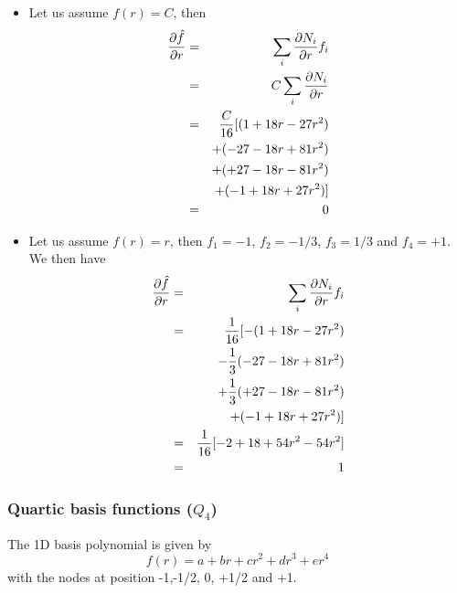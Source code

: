 \begin{itemize}
\item
Let us assume $f(r)=C$, then
\begin{eqnarray}
\frac{\partial \hat{f}}{\partial r} 
&=& \sum_i \frac{\partial N_i}{\partial r} f_i  \nonumber\\
&=&  C \sum_i \frac{\partial N_i}{\partial r}  \nonumber\\
&=& \frac{C}{16} [  (  1 +18r - 27r^2 ) \nonumber\\
&&+ (-27 -18r + 81r^2 )  \nonumber\\
&&+  (+27 -18r - 81r^2 ) \nonumber\\
&&+ ( -1 +18r + 27r^2 ) ]  \nonumber\\
&=& 0 \nonumber
\end{eqnarray}

\item
Let us assume $f(r)= r$, then $f_1=-1$, $f_2=-1/3$, $f_3=1/3$ and $f_4=+1$. We then have
\begin{eqnarray}
\frac{\partial \hat{f}}{\partial r} 
&=& \sum_i \frac{\partial N_i}{\partial r} f_i  \nonumber\\
&=& \frac{1}{16} [  -(  1 +18r - 27r^2 ) \nonumber\\ 
&& -\frac{1}{3} (-27 -18r + 81r^2 )  \nonumber\\
&& +\frac{1}{3}  (+27 -18r - 81r^2 ) \nonumber\\
&& + ( -1 +18r + 27r^2 ) ]  \nonumber\\
&=& \frac{1}{16} [-2 + 18 + 54r^2 - 54r^2] \nonumber\\
&=& 1 \nonumber
\end{eqnarray}

\end{itemize}

\subsubsection{Quartic basis functions ($Q_4$)}

The 1D basis polynomial is given by
\[
f(r)=a+br+cr^2+dr^3+er^4
\]
with the nodes at position -1,-1/2, 0, +1/2 and +1.

